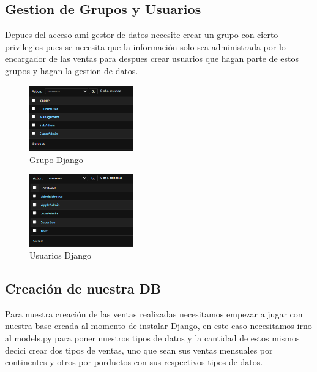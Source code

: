 \documentclass[conference]{IEEEtran}
\begin{document}
\subsection{Gestion de Grupos y Usuarios}
Depues del acceso ami gestor de datos necesite crear un grupo con cierto privilegios pues se necesita que la información solo sea administrada por lo encargador de las ventas para despues crear usuarios que hagan parte de estos grupos y hagan la gestion de datos.

\begin{figure}[h] %
    \centering
    \includegraphics[width=0.4\textwidth]{images/Grupo.png} %
    \caption{Grupo Django }
    \label{fig:mi_imagen}
\end{figure}

\begin{figure}[h] %
    \centering
    \includegraphics[width=0.4\textwidth]{images/Users.png} %
    \caption{Usuarios Django }
    \label{fig:mi_imagen}
\end{figure}
\subsection{Creación de nuestra DB}
Para nuestra creación de las ventas realizadas necesitamos empezar a jugar con nuestra base creada al momento de instalar Django, en este caso necesitamos irno al models.py para poner nuestros tipos de datos y la cantidad de estos mismos decici crear dos tipos de ventas, uno que sean sus ventas mensuales por continentes y otros por porductos con sus respectivos tipos de datos.
\end{document}
